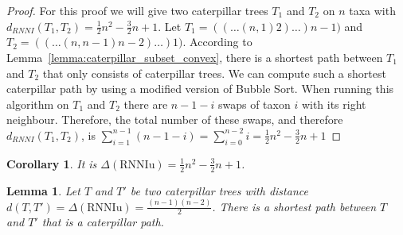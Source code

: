 \documentclass[11pt, a4paper]{article}
\newcommand{\rnniu}{\mathrm{RNNIu}}
\newtheorem{lemma}[definition]{Lemma}
\newtheorem{corollary}[definition]{Corollary}
\begin{document}
\begin{proof}
    For this proof we will give two caterpillar trees $T_1$ and $T_2$ on $n$ taxa with $d_{RNNI}(T_1,T_2) = \frac{1}{2}n^2-\frac{3}{2}n+1$.
	Let $T_1 = (( \dots (n,1)2)\dots)n-1)$ and $T_2 = (( \dots (n,n-1)n-2)\dots)1)$.
    According to Lemma~\ref{lemma:caterpillar_subset_convex}, there is a shortest path between $T_1$ and $T_2$ that only consists of caterpillar trees.
    We can compute such a shortest caterpillar path by using a modified version of Bubble Sort.
    When running this algorithm on $T_1$ and $T_2$ there are $n-1-i$ swaps of taxon $i$ with its right neighbour.
    Therefore, the total number of these swaps, and therefore $d_{RNNI}(T_1,T_2)$, is $\sum\limits_{i=1}^{n-1}(n-1-i) = \sum\limits_{i=0}^{n-2}i = \frac{1}{2}n^2-\frac{3}{2}n+1$
\end{proof}

\begin{corollary}
It is $\Delta(\rnniu) = \frac{1}{2}n^2-\frac{3}{2}n+1$.
\end{corollary}


\begin{lemma}
    Let $T$ and $T'$ be two caterpillar trees with distance $d(T,T') = \Delta(\rnniu) = \frac{(n-1)(n-2)}{2}$.
    There is a shortest path between $T$ and $T'$ that is a caterpillar path.
    \label{lemma:caterpillar_dist=diameter}
\end{lemma}

\end{document}

